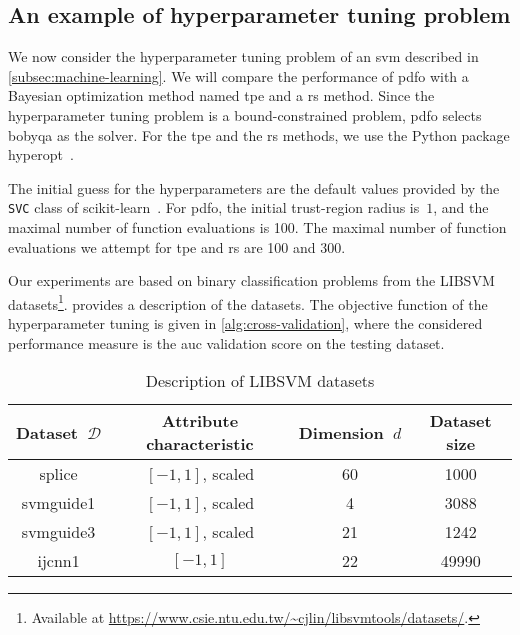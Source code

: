 \subsection{An example of hyperparameter tuning problem}

We now consider the hyperparameter tuning problem of an \gls{svm} described in \cref{subsec:machine-learning}.
We will compare the performance of \gls{pdfo} with a Bayesian optimization method named \gls{tpe} and a \gls{rs} method.
Since the hyperparameter tuning problem is a bound-constrained problem, \gls{pdfo} selects \gls{bobyqa} as the solver.
For the \gls{tpe} and the \gls{rs} methods, we use the Python package hyperopt~\cite{Bergstra_Yamins_Cox_2013}.

The initial guess for the hyperparameters are the default values provided by the \texttt{SVC} class of scikit-learn~\cite{Pedregosa_Etal_2011}.
For \gls{pdfo}, the initial trust-region radius is~$1$, and the maximal number of function evaluations is \num{100}.
The maximal number of function evaluations we attempt for \gls{tpe} and \gls{rs} are \num{100} and \num{300}.

Our experiments are based on binary classification problems from the LIBSVM datasets\footnote{Available at \url{https://www.csie.ntu.edu.tw/~cjlin/libsvmtools/datasets/}.}.
 provides a description of the datasets.
The objective function of the hyperparameter tuning is given in \cref{alg:cross-validation}, where the considered performance measure is the \gls{auc} validation score on the testing dataset.

\begin{table}[ht]
    \caption{Description of LIBSVM datasets}
    \label{tab:htdata}
    \centering
    \begin{tabular}{ccS[table-parse-only]S[table-parse-only]}
        \toprule
        Dataset~$\mathcal{D}$   & Attribute characteristic  & {Dimension~$d$}   & {Dataset size}\\
        \midrule
        splice                  & $[-1, 1]$, scaled         & 60                & 1000\\
        svmguide1               & $[-1, 1]$, scaled         & 4                 & 3088\\
        svmguide3               & $[-1, 1]$, scaled         & 21                & 1242\\
        ijcnn1                  & $[-1, 1]$                 & 22                & 49990\\
        \bottomrule
    \end{tabular}
\end{table}
%

